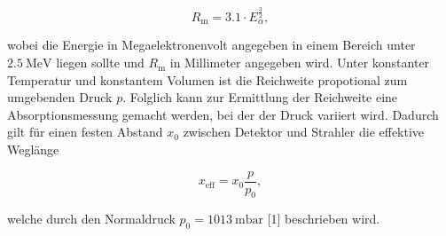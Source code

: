 \begin{equation}
R_\text{m}= \num{3.1}\cdot E_\alpha^\frac{3}{2},
\label{eqn:energie}
\end{equation}

wobei die Energie in Megaelektronenvolt angegeben in einem Bereich unter $\SI{2.5}{\mega\eV}$ liegen sollte und 
$R_\text{m}$ in Millimeter angegeben wird. Unter konstanter Temperatur und konstantem Volumen ist die Reichweite 
propotional zum umgebenden Druck $p$. Folglich kann zur Ermittlung der Reichweite eine Absorptionsmessung 
gemacht werden, bei der der Druck variiert wird. Dadurch gilt für einen festen Abstand $x_0$ zwischen Detektor 
und Strahler die effektive Weglänge 

\begin{equation}
x_\text{eff} = x_0 \frac{p}{p_0},
\label{eqn:Weglaenge}
\end{equation}

welche durch den Normaldruck $p_0 = \SI{1013}{\milli\bar}$ [1] beschrieben wird. 
